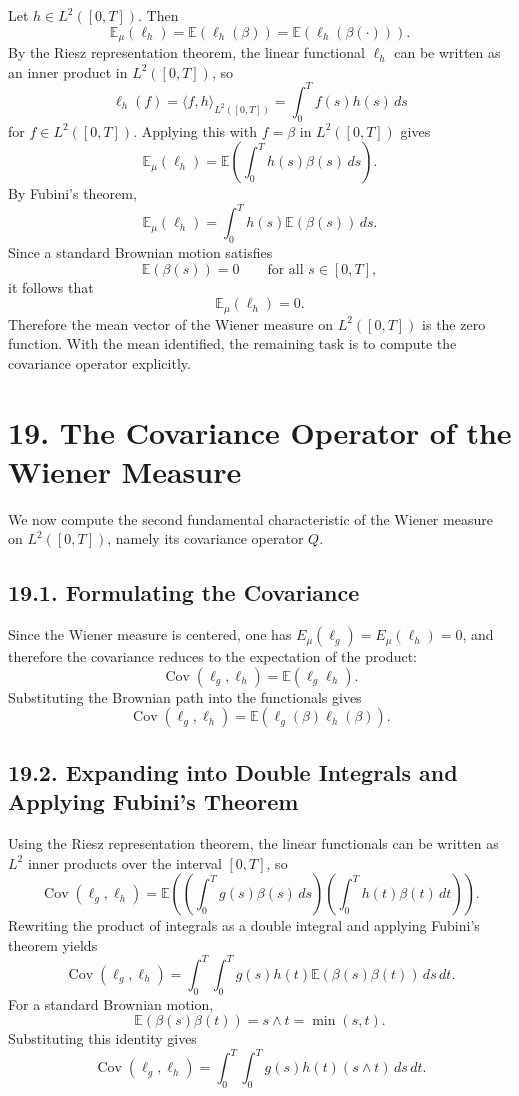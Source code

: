 \documentclass[11pt]{article}
\theoremstyle{definition}
\theoremstyle{remark}
\begin{document}
Let $h\in L^2([0,T])$. Then
\[
\mathbb E_{\mu}(\ell_h)
=
\mathbb E(\ell_h(\beta))
=
\mathbb E(\ell_h(\beta(\cdot))).
\]
By the Riesz representation theorem, the linear functional $\ell_h$ can be written as an inner product in $L^2([0,T])$, so
\[
\ell_h(f)=\langle f,h\rangle_{L^2([0,T])}=\int_0^T f(s)h(s)\,ds
\]
for $f\in L^2([0,T])$. Applying this with $f=\beta$ in $L^2([0,T])$ gives
\[
\mathbb E_{\mu}(\ell_h)
=
\mathbb E\left(\int_0^T h(s)\beta(s)\,ds\right).
\]
By Fubini's theorem,
\[
\mathbb E_{\mu}(\ell_h)
=
\int_0^T h(s)\mathbb E(\beta(s))\,ds.
\]
Since a standard Brownian motion satisfies
\[
\mathbb E(\beta(s))=0
\qquad \text{for all } s\in[0,T],
\]
it follows that
\[
\mathbb E_{\mu}(\ell_h)=0.
\]
Therefore the mean vector of the Wiener measure on $L^2([0,T])$ is the zero function.
With the mean identified, the remaining task is to compute the covariance operator explicitly.

\section*{19. The Covariance Operator of the Wiener Measure}
We now compute the second fundamental characteristic of the Wiener measure on $L^2([0,T])$, namely its covariance operator $Q$.

\subsection*{19.1. Formulating the Covariance}
Since the Wiener measure is centered, one has $E_\mu(\ell_g)=E_\mu(\ell_h)=0$, and therefore the covariance reduces to the expectation of the product:
\[
\operatorname{Cov}(\ell_g,\ell_h)=\mathbb E(\ell_g\ell_h).
\]
Substituting the Brownian path into the functionals gives
\[
\operatorname{Cov}(\ell_g,\ell_h)=\mathbb E(\ell_g(\beta)\ell_h(\beta)).
\]

\subsection*{19.2. Expanding into Double Integrals and Applying Fubini's Theorem}
Using the Riesz representation theorem, the linear functionals can be written as $L^2$ inner products over the interval $[0,T]$, so
\[
\operatorname{Cov}(\ell_g,\ell_h)
=
\mathbb E\left(\left(\int_0^T g(s)\beta(s)\,ds\right)\left(\int_0^T h(t)\beta(t)\,dt\right)\right).
\]
Rewriting the product of integrals as a double integral and applying Fubini's theorem yields
\[
\operatorname{Cov}(\ell_g,\ell_h)
=
\int_0^T\int_0^T g(s)h(t)\mathbb E(\beta(s)\beta(t))\,ds\,dt.
\]
For a standard Brownian motion,
\[
\mathbb E(\beta(s)\beta(t))=s\wedge t=\min(s,t).
\]
Substituting this identity gives
\[
\operatorname{Cov}(\ell_g,\ell_h)
=
\int_0^T\int_0^T g(s)h(t)(s\wedge t)\,ds\,dt.
\]
\end{document}
